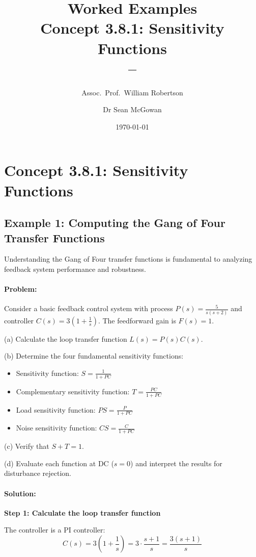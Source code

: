 \documentclass[11pt,a4paper]{article}
\title{\textbf{Worked Examples}\\[0.5em]
\large Concept 3.8.1: Sensitivity Functions\\[0.3em]
\normalsize \coursesubtitle{} -- \coursetitle}
\author{Assoc.\ Prof.\ William Robertson \and Dr Sean McGowan}
\date{\today}
\begin{document}
\maketitle
\tableofcontents
\newpage

\section{Concept 3.8.1: Sensitivity Functions}

\subsection{Example 1: Computing the Gang of Four Transfer Functions}

Understanding the Gang of Four transfer functions is fundamental to analyzing feedback system performance and robustness.

\paragraph{Problem:}
Consider a basic feedback control system with process $P(s) = \frac{5}{s(s+2)}$ and controller $C(s) = 3(1 + \frac{1}{s})$. The feedforward gain is $F(s) = 1$.

(a) Calculate the loop transfer function $L(s) = P(s)C(s)$.

(b) Determine the four fundamental sensitivity functions:
\begin{itemize}
  \item Sensitivity function: $S = \frac{1}{1+PC}$
  \item Complementary sensitivity function: $T = \frac{PC}{1+PC}$
  \item Load sensitivity function: $PS = \frac{P}{1+PC}$
  \item Noise sensitivity function: $CS = \frac{C}{1+PC}$
\end{itemize}

(c) Verify that $S + T = 1$.

(d) Evaluate each function at DC ($s = 0$) and interpret the results for disturbance rejection.

\paragraph{Solution:}

\textbf{Step 1: Calculate the loop transfer function}

The controller is a PI controller:
\begin{equation}
  C(s) = 3\left(1 + \frac{1}{s}\right) = 3\cdot\frac{s+1}{s} = \frac{3(s+1)}{s}
\end{equation}
\end{document}
